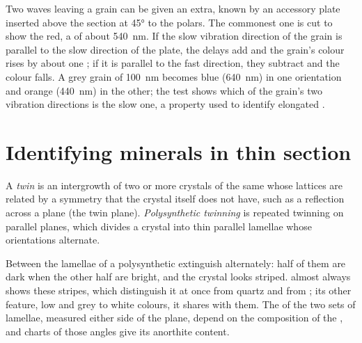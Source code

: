 Two waves leaving a grain can be given an extra, known  by an
accessory plate inserted above the section at \ang{45} to the polars. The
commonest one is cut to show the  red, a  of about
\qty{540}{nm}. If the slow vibration direction of the grain is parallel to
the slow direction of the plate, the delays add and the grain's colour rises
by about one ; if it is parallel to the fast direction, they subtract and
the colour falls. A  grey grain of \qty{100}{nm} becomes
 blue (\qty{640}{nm}) in one orientation and  orange
(\qty{440}{nm}) in the other; the test shows which of the grain's two
vibration directions is the slow one, a property used to identify elongated
.

\section{Identifying minerals in thin section}

\begin{definition}\label{def:b1:optical-mineralogy:twin}
A \emph{twin} is an intergrowth of two or more crystals
of the same  whose lattices are related by a symmetry that the crystal
itself does not have, such as a reflection across a plane (the twin plane).
\emph{Polysynthetic twinning} is repeated
twinning on parallel planes, which divides a crystal into thin parallel
lamellae whose orientations alternate.
\end{definition}

Between  the lamellae of a polysynthetic  extinguish
alternately: half of them are dark when the other half are bright, and the
crystal looks striped.  almost always shows these stripes, which
distinguish it at once from quartz and from ; its other
feature, low  and  grey to white colours, it shares with
them. The  of the two sets of lamellae, measured either side
of the  plane, depend on the composition of the , and charts
of those angles give its anorthite content.


